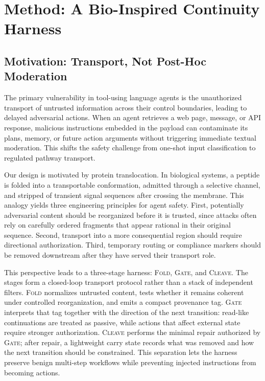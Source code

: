 \section{Method: A Bio-Inspired Continuity Harness}

\subsection{Motivation: Transport, Not Post-Hoc Moderation}

The primary vulnerability in tool-using language agents is the unauthorized transport of untrusted information across their control boundaries, leading to delayed adversarial actions. When an agent retrieves a web page, message, or API response, malicious instructions embedded in the payload can contaminate its plans, memory, or future action arguments without triggering immediate textual moderation. This shifts the safety challenge from one-shot input classification to regulated pathway transport.

Our design is motivated by protein translocation. In biological systems, a peptide is folded into a transportable conformation, admitted through a selective channel, and stripped of transient signal sequences after crossing the membrane. This analogy yields three engineering principles for agent safety. First, potentially adversarial content should be reorganized before it is trusted, since attacks often rely on carefully ordered fragments that appear rational in their original sequence. Second, transport into a more consequential region should require directional authorization. Third, temporary routing or compliance markers should be removed downstream after they have served their transport role.

This perspective leads to a three-stage harness: \textsc{Fold}, \textsc{Gate}, and \textsc{Cleave}. The stages form a closed-loop transport protocol rather than a stack of independent filters. \textsc{Fold} normalizes untrusted content, tests whether it remains coherent under controlled reorganization, and emits a compact provenance tag. \textsc{Gate} interprets that tag together with the direction of the next transition: read-like continuations are treated as passive, while actions that affect external state require stronger authorization. \textsc{Cleave} performs the minimal repair authorized by \textsc{Gate}; after repair, a lightweight carry state records what was removed and how the next transition should be constrained. This separation lets the harness preserve benign multi-step workflows while preventing injected instructions from becoming actions.

